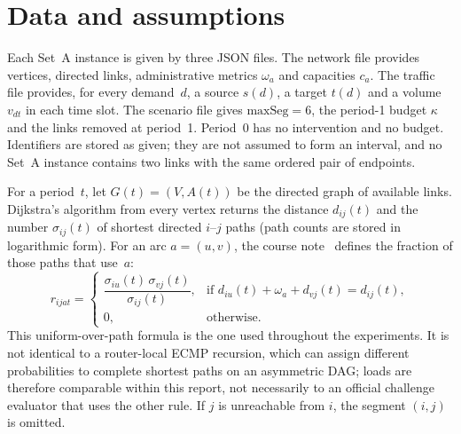 \section{Data and assumptions}
\label{sec:data}

Each Set~A instance is given by three JSON files.
The network file provides vertices, directed links, administrative metrics $\omega_a$ and
capacities $c_a$.
The traffic file provides, for every demand~$d$, a source $s(d)$, a target $t(d)$ and a
volume $v_{dt}$ in each time slot.
The scenario file gives $\mathrm{maxSeg}=6$, the period-1 budget $\kappa$ and the links
removed at period~1.
Period~0 has no intervention and no budget.
Identifiers are stored as given; they are not assumed to form an interval, and no Set~A
instance contains two links with the same ordered pair of endpoints.

For a period~$t$, let $G(t)=(V,A(t))$ be the directed graph of available links.
Dijkstra's algorithm from every vertex returns the distance $d_{ij}(t)$ and the number
$\sigma_{ij}(t)$ of shortest directed $i$--$j$ paths (path counts are stored in logarithmic
form).
For an arc $a=(u,v)$, the course note~\citep{courser2026} defines the fraction of those
paths that use~$a$:
\begin{equation}
r_{ijat}=
\begin{cases}
\dfrac{\sigma_{iu}(t)\,\sigma_{vj}(t)}{\sigma_{ij}(t)},
  & \text{if } d_{iu}(t)+\omega_a+d_{vj}(t)=d_{ij}(t),\\[0.35em]
0, & \text{otherwise.}
\end{cases}
\label{eq:r}
\end{equation}
This uniform-over-path formula is the one used throughout the experiments.
It is not identical to a router-local ECMP recursion, which can assign different probabilities
to complete shortest paths on an asymmetric DAG; loads are therefore comparable within this
report, not necessarily to an official challenge evaluator that uses the other rule.
If $j$ is unreachable from $i$, the segment $(i,j)$ is omitted.
